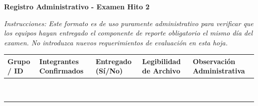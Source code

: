 \documentclass[11pt, a4paper]{article}
\begin{document}
\begin{tcolorbox}[colback=ucbblue!5!white, colframe=ucbblue, title=\textbf{Control de Recepción: Reportes de Laboratorio (A+B)}]
    \centering \textbf{Registro Administrativo - Examen Hito 2}
\end{tcolorbox}

\noindent \textit{Instrucciones: Este formato es de uso puramente administrativo para verificar que los equipos hayan entregado el componente de reporte obligatorio el mismo día del examen. No introduzca nuevos requerimientos de evaluación en esta hoja.}

\vspace{0.4cm}
\renewcommand{\arraystretch}{1.5}
\noindent
\begin{tabularx}{\textwidth}{>{\centering\arraybackslash}p{2cm} >{\RaggedRight\arraybackslash}X >{\centering\arraybackslash}p{2cm} >{\centering\arraybackslash}p{2.5cm} >{\RaggedRight\arraybackslash}X}
\toprule
\textbf{Grupo / ID} & \textbf{Integrantes Confirmados} & \textbf{Entregado (Sí/No)} & \textbf{Legibilidad de Archivo} & \textbf{Observación Administrativa} \\ 
\midrule
 & & & & \\ \addlinespace
 & & & & \\ \addlinespace
 & & & & \\ \addlinespace
 & & & & \\ \addlinespace
 & & & & \\ \addlinespace
 & & & & \\ \addlinespace
 & & & & \\ \addlinespace
 & & & & \\ \addlinespace
 & & & & \\ 
\bottomrule
\end{tabularx}
\end{document}
